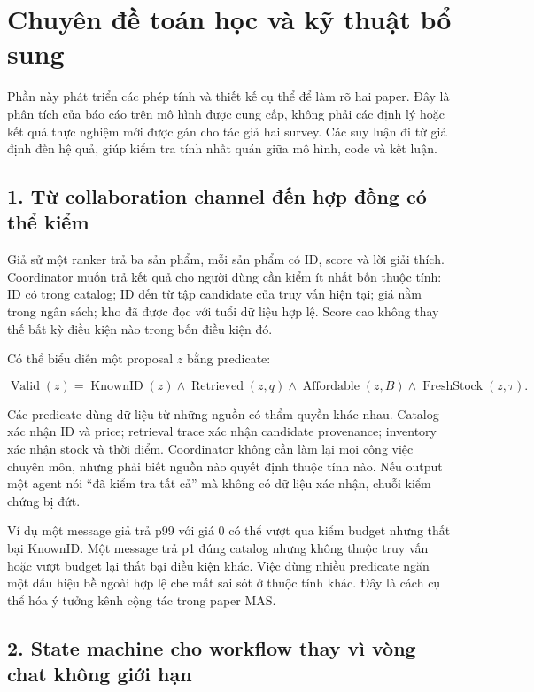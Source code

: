 \section{Chuyên đề toán học và kỹ thuật bổ
sung}\label{chuyuxean-ux111ux1ec1-touxe1n-hux1ecdc-vuxe0-kux1ef9-thuux1eadt-bux1ed5-sung}

Phần này phát triển các phép tính và thiết kế cụ thể để làm rõ hai
paper. Đây là phân tích của báo cáo trên mô hình được cung cấp, không
phải các định lý hoặc kết quả thực nghiệm mới được gán cho tác giả hai
survey. Các suy luận đi từ giả định đến hệ quả, giúp kiểm tra tính nhất
quán giữa mô hình, code và kết luận.

\subsection{1. Từ collaboration channel đến hợp đồng có thể
kiểm}\label{tux1eeb-collaboration-channel-ux111ux1ebfn-hux1ee3p-ux111ux1ed3ng-cuxf3-thux1ec3-kiux1ec3m}

Giả sử một ranker trả ba sản phẩm, mỗi sản phẩm có ID, score và lời giải
thích. Coordinator muốn trả kết quả cho người dùng cần kiểm ít nhất bốn
thuộc tính: ID có trong catalog; ID đến từ tập candidate của truy vấn
hiện tại; giá nằm trong ngân sách; kho đã được đọc với tuổi dữ liệu hợp
lệ. Score cao không thay thế bất kỳ điều kiện nào trong bốn điều kiện
đó.

Có thể biểu diễn một proposal \(z\) bằng predicate:

\[\operatorname{Valid}(z)=\operatorname{KnownID}(z)\land\operatorname{Retrieved}(z,q)\land
\operatorname{Affordable}(z,B)\land\operatorname{FreshStock}(z,\tau).\]

Các predicate dùng dữ liệu từ những nguồn có thẩm quyền khác nhau.
Catalog xác nhận ID và price; retrieval trace xác nhận candidate
provenance; inventory xác nhận stock và thời điểm. Coordinator không cần
làm lại mọi công việc chuyên môn, nhưng phải biết nguồn nào quyết định
thuộc tính nào. Nếu output một agent nói ``đã kiểm tra tất cả'' mà không
có dữ liệu xác nhận, chuỗi kiểm chứng bị đứt.

Ví dụ một message giả trả p99 với giá 0 có thể vượt qua kiểm budget
nhưng thất bại KnownID. Một message trả p1 đúng catalog nhưng không
thuộc truy vấn hoặc vượt budget lại thất bại điều kiện khác. Việc dùng
nhiều predicate ngăn một dấu hiệu bề ngoài hợp lệ che mất sai sót ở
thuộc tính khác. Đây là cách cụ thể hóa ý tưởng kênh cộng tác trong
paper MAS.

\subsection{2. State machine cho workflow thay vì vòng chat không giới
hạn}\label{state-machine-cho-workflow-thay-vuxec-vuxf2ng-chat-khuxf4ng-giux1edbi-hux1ea1n}

